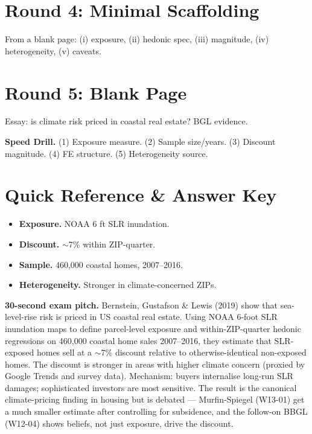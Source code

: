 \documentclass[11pt]{article}
\begin{document}
\section*{Round 4: Minimal Scaffolding}
From a blank page: (i) exposure, (ii) hedonic spec, (iii) magnitude, (iv) heterogeneity, (v) caveats.

\section*{Round 5: Blank Page}
Essay: is climate risk priced in coastal real estate? BGL evidence.

\vspace{6pt}
\begin{drillbox}
\textbf{Speed Drill.} (1) Exposure measure. (2) Sample size/years. (3) Discount magnitude. (4) FE structure. (5) Heterogeneity source.
\end{drillbox}

\section*{Quick Reference \& Answer Key}
\begin{answerbox}
\begin{itemize}
\item \textbf{Exposure.} NOAA 6 ft SLR inundation.
\item \textbf{Discount.} $\sim$7\% within ZIP-quarter.
\item \textbf{Sample.} 460{,}000 coastal homes, 2007--2016.
\item \textbf{Heterogeneity.} Stronger in climate-concerned ZIPs.
\end{itemize}
\end{answerbox}

\begin{keybox}
\textbf{30-second exam pitch.} Bernstein, Gustafson \& Lewis (2019) show that sea-level-rise risk is priced in US coastal real estate. Using NOAA 6-foot SLR inundation maps to define parcel-level exposure and within-ZIP-quarter hedonic regressions on 460{,}000 coastal home sales 2007--2016, they estimate that SLR-exposed homes sell at a $\sim$7\% discount relative to otherwise-identical non-exposed homes. The discount is stronger in areas with higher climate concern (proxied by Google Trends and survey data). Mechanism: buyers internalise long-run SLR damages; sophisticated investors are most sensitive. The result is the canonical climate-pricing finding in housing but is debated --- Murfin-Spiegel (W13-01) get a much smaller estimate after controlling for subsidence, and the follow-on BBGL (W12-04) shows beliefs, not just exposure, drive the discount.
\end{keybox}
\end{document}
